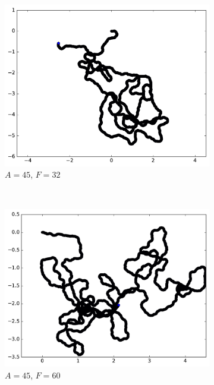 \begin{figure}[htb]
\begin{subfigure}[t]{\subImgWmo}
			\includegraphics[width=\textwidth]{figures/ch3/synTraj_219_45_32}
			\caption[$A = 45$, $F=32$]{$A = 45$, $F=32$}
			\label{fig:synTraj_219_45_32}
		\end{subfigure}
		~
		\begin{subfigure}[t]{\subImgWmo}
			\centering
			\includegraphics[width=\textwidth]{figures/ch3/synTraj_219_45_60}
			\caption[$A = 45$, $F=60$]{$A = 45$, $F=60$}
			\label{fig:synTraj_219_45_60}
		\end{subfigure}
		~
		\begin{subfigure}[t]{\subImgWmo}
			\centering

\end{subfigure}
\end{figure}
